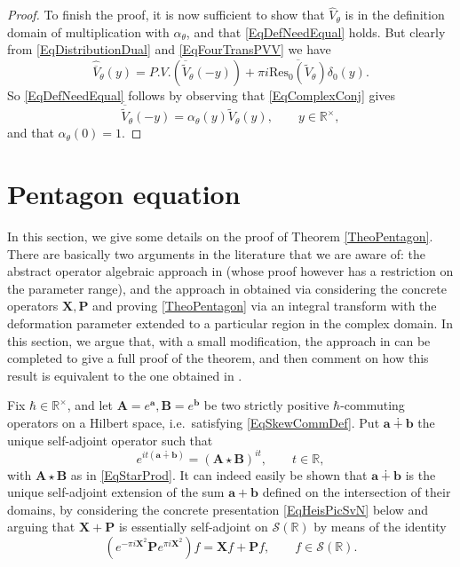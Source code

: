 \documentclass[11pt, reqno]{amsart}
\theoremstyle{definition}
\numberwithin{equation}{section}
\def\R{\mathbb R}
\def\Res{\mathrm{Res}}
\def\Sc{\mathcal S}
\newcommand{\Pb}{\mathbf{P}}
\newcommand{\Xb}{\mathbf{X}}
\newcommand{\Ab}{\mathbf{A}}
\newcommand{\Bb}{\mathbf{B}}
\begin{document}
\begin{proof}
To finish the proof, it is now sufficient to show that $\hat{V}_{\theta}$ is in the definition domain of multiplication with $\alpha_{\theta}$, and that \eqref{EqDefNeedEqual} holds. But clearly from  \eqref{EqDistributionDual} and \eqref{EqFourTransPVV} we have
\[
\hat{\overline{V}}_{\theta}(y) = P.V.(\overline{\widetilde{V}}_{\theta}(-y)) + \pi  i \overline{\Res_0(\widetilde{V}_{\theta})}\delta_0(y).
\]
So \eqref{EqDefNeedEqual} follows by observing that  \eqref{EqComplexConj} gives 
\[
\overline{\widetilde{V}}_{\theta}(-y) = \alpha_{\theta}(y)\widetilde{V}_{\theta}(y),\qquad y \in \R^{\times}, 
\]
and that $\alpha_{\theta}(0) = 1$.
\end{proof}

\section{Pentagon equation}\label{SecPentQE}

In this section, we give some details on the proof of Theorem \ref{TheoPentagon}. There are basically two arguments in the literature that we are aware of: the abstract operator algebraic approach in \cite{Wor00} (whose proof however has a restriction on the parameter range), and the approach in \cite{FKV01} obtained via considering the concrete operators $\Xb,\Pb$ and proving \eqref{TheoPentagon} via an integral transform with the deformation parameter extended to a particular region in the complex domain. In this section, we argue that, with a small modification, the approach in \cite{Wor00} can be completed to give a full proof of the theorem, and then comment on how this result is equivalent to the one obtained in \cite{FKV01}. 

Fix $\hbar\in \R^{\times}$, and let $\Ab= e^{\mathbf{a}},\Bb= e^{\mathbf{b}}$ be two strictly positive $\hbar$-commuting operators on a Hilbert space, i.e.\ satisfying \eqref{EqSkewCommDef}. Put $\mathbf{a} \dotplus \mathbf{b}$ the unique self-adjoint operator such that 
\[
e^{it(\mathbf{a}\dotplus \mathbf{b})} = (\Ab\star\Bb)^{it},\qquad t\in \R, 
\]
with $\Ab\star\Bb$ as in \eqref{EqStarProd}. It can indeed easily be shown that $\mathbf{a} \dotplus \mathbf{b}$ is the unique self-adjoint extension of the sum $\mathbf{a}+\mathbf{b}$ defined on the intersection of their domains, by considering the concrete presentation \eqref{EqHeisPicSvN} below and arguing that $\Xb+\Pb$ is essentially self-adjoint on $\Sc(\R)$ by means of the identity
\begin{equation}\label{EqTransformSum}
(e^{-\pi i \Xb^2}\Pb e^{\pi i \Xb^2})f = \Xb f +\Pb f,\qquad f \in \Sc(\R).
\end{equation}
\end{document}
